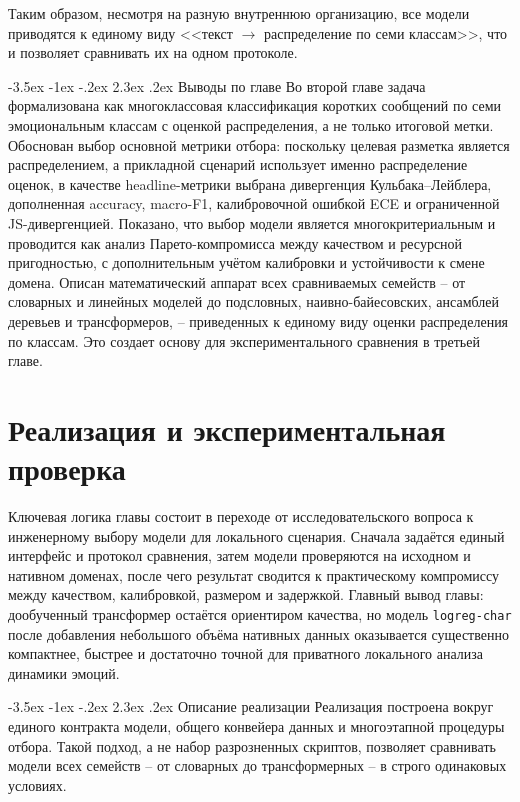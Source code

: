 \documentclass[12pt,a4paper]{report}
\makeatletter
\renewcommand{\section}{\@startsection{section}{1}{\z@}%
  {-3.5ex \@plus -1ex \@minus -.2ex}%
  {2.3ex \@plus .2ex}%
  {\normalfont\large\bfseries\centering}}
\makeatother
\begin{document}
Таким образом, несмотря на разную внутреннюю организацию, все модели приводятся к единому виду <<текст \(\to\) распределение по семи классам>>, что и позволяет сравнивать их на одном протоколе.

\section{Выводы по главе}
Во второй главе задача формализована как многоклассовая классификация коротких сообщений по семи эмоциональным классам с оценкой распределения, а не только итоговой метки. Обоснован выбор основной метрики отбора: поскольку целевая разметка является распределением, а прикладной сценарий использует именно распределение оценок, в качестве headline-метрики выбрана дивергенция Кульбака--Лейблера, дополненная accuracy, macro-F1, калибровочной ошибкой ECE и ограниченной JS-дивергенцией. Показано, что выбор модели является многокритериальным и проводится как анализ Парето-компромисса между качеством и ресурсной пригодностью, с дополнительным учётом калибровки и устойчивости к смене домена. Описан математический аппарат всех сравниваемых семейств -- от словарных и линейных моделей до подсловных, наивно-байесовских, ансамблей деревьев и трансформеров, -- приведенных к единому виду оценки распределения по классам. Это создает основу для экспериментального сравнения в третьей главе.

\chapter{Реализация и экспериментальная проверка}

Ключевая логика главы состоит в переходе от исследовательского вопроса к инженерному выбору модели для локального сценария. Сначала задаётся единый интерфейс и протокол сравнения, затем модели проверяются на исходном и нативном доменах, после чего результат сводится к практическому компромиссу между качеством, калибровкой, размером и задержкой. Главный вывод главы: дообученный трансформер остаётся ориентиром качества, но модель \texttt{logreg-char} после добавления небольшого объёма нативных данных оказывается существенно компактнее, быстрее и достаточно точной для приватного локального анализа динамики эмоций.

\section{Описание реализации}
Реализация построена вокруг единого контракта модели, общего конвейера данных и многоэтапной процедуры отбора. Такой подход, а не набор разрозненных скриптов, позволяет сравнивать модели всех семейств -- от словарных до трансформерных -- в строго одинаковых условиях.
\end{document}
